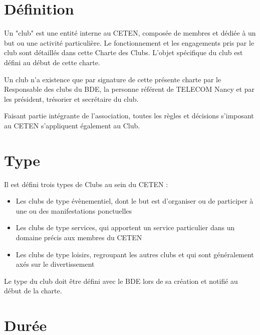 \documentclass{article} %
\begin{document}
	\begin{multicols}{2}
		
		\section{Définition}
			
		{\small
			
			Un "club" est une entité interne au CETEN, composée de membres et
			dédiée à un but ou une activité particulière. Le fonctionnement et
			les engagements pris par le club sont détaillés dans cette Charte
			des Clubs. L’objet spécifique du club est défini au début de cette
			charte.

			Un club n’a existence que par signature de cette présente charte par
			le Responsable des clubs du BDE, la personne référent de TELECOM
			Nancy et par les président, trésorier et secrétaire du club.

			Faisant partie intégrante de l’association, toutes les règles et
			décisions s’imposant au CETEN s’appliquent également au Club.
			
			}

		\section{Type}
			
		{\small
		
			Il est défini trois types de Clubs au sein du CETEN :
			\begin{itemize}
				\item Les clubs de type évènementiel, dont le but est
					d’organiser ou de participer à une ou des manifestations
					ponctuelles
				\item Les clubs de type services, qui apportent un service
					particulier dans un domaine précis aux membres du CETEN
				\item Les clubs de type loisirs, regroupant les autres clubs et
					qui sont généralement axés sur le divertissement
			\end{itemize}
			Le type du club doit être défini avec le BDE lors de sa création et
			notifié au début de la charte.
			
		}
		
		\section{Durée}
		
		{\small
			
}
\end{multicols}
\end{document}
